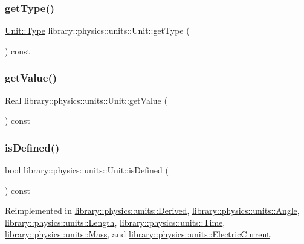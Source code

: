 \subsubsection{\texorpdfstring{get\+Type()}{getType()}}
{\footnotesize\ttfamily \hyperlink{classlibrary_1_1physics_1_1units_1_1_unit_a828bc1b6ad6fa5cbef904ea0fede986a}{Unit\+::\+Type} library\+::physics\+::units\+::\+Unit\+::get\+Type (\begin{DoxyParamCaption}{ }\end{DoxyParamCaption}) const}

\mbox{\label{classlibrary_1_1physics_1_1units_1_1_unit_ab6541add236a0c2e5bbfb4b5b35126fb}} 
\subsubsection{\texorpdfstring{get\+Value()}{getValue()}}
{\footnotesize\ttfamily Real library\+::physics\+::units\+::\+Unit\+::get\+Value (\begin{DoxyParamCaption}{ }\end{DoxyParamCaption}) const}

\mbox{\label{classlibrary_1_1physics_1_1units_1_1_unit_a5ce011c1ffa0fce4cf1f5d42ff06ee78}} 
\subsubsection{\texorpdfstring{is\+Defined()}{isDefined()}}
{\footnotesize\ttfamily bool library\+::physics\+::units\+::\+Unit\+::is\+Defined (\begin{DoxyParamCaption}{ }\end{DoxyParamCaption}) const\hspace{0.3cm}{\ttfamily [virtual]}}



Reimplemented in \hyperlink{classlibrary_1_1physics_1_1units_1_1_derived_a26c20c57fc3a7c2fb2ff215d6d4687a2}{library\+::physics\+::units\+::\+Derived}, \hyperlink{classlibrary_1_1physics_1_1units_1_1_angle_a77c7849734ce02b55e070fb88fd87f71}{library\+::physics\+::units\+::\+Angle}, \hyperlink{classlibrary_1_1physics_1_1units_1_1_length_a0249a542e7cc613e6a39275b4e37bd05}{library\+::physics\+::units\+::\+Length}, \hyperlink{classlibrary_1_1physics_1_1units_1_1_time_ab62163386c3253277c5ba71782261cad}{library\+::physics\+::units\+::\+Time}, \hyperlink{classlibrary_1_1physics_1_1units_1_1_mass_a0efde6eb08d6b79baa84229746776b6a}{library\+::physics\+::units\+::\+Mass}, and \hyperlink{classlibrary_1_1physics_1_1units_1_1_electric_current_a52796b966074a631c569ac93d22869af}{library\+::physics\+::units\+::\+Electric\+Current}.

